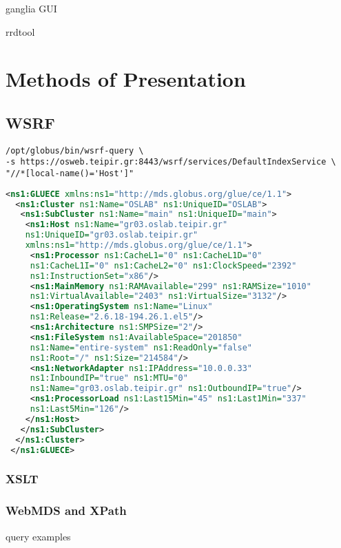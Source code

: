 ganglia GUI

rrdtool

\section{Methods of Presentation}


\subsection{WSRF}
\begin{verbatim}
/opt/globus/bin/wsrf-query \
-s https://osweb.teipir.gr:8443/wsrf/services/DefaultIndexService \
"//*[local-name()='Host']"
\end{verbatim}


\begin{lstlisting}[language=XML,caption=WSRF query output]
 <ns1:GLUECE xmlns:ns1="http://mds.globus.org/glue/ce/1.1">
  <ns1:Cluster ns1:Name="OSLAB" ns1:UniqueID="OSLAB">
   <ns1:SubCluster ns1:Name="main" ns1:UniqueID="main">
    <ns1:Host ns1:Name="gr03.oslab.teipir.gr" 
    ns1:UniqueID="gr03.oslab.teipir.gr" 
    xmlns:ns1="http://mds.globus.org/glue/ce/1.1">
     <ns1:Processor ns1:CacheL1="0" ns1:CacheL1D="0" 
     ns1:CacheL1I="0" ns1:CacheL2="0" ns1:ClockSpeed="2392" 
     ns1:InstructionSet="x86"/>
     <ns1:MainMemory ns1:RAMAvailable="299" ns1:RAMSize="1010" 
     ns1:VirtualAvailable="2403" ns1:VirtualSize="3132"/>
     <ns1:OperatingSystem ns1:Name="Linux"
     ns1:Release="2.6.18-194.26.1.el5"/>
     <ns1:Architecture ns1:SMPSize="2"/>
     <ns1:FileSystem ns1:AvailableSpace="201850" 
     ns1:Name="entire-system" ns1:ReadOnly="false"
     ns1:Root="/" ns1:Size="214584"/>
     <ns1:NetworkAdapter ns1:IPAddress="10.0.0.33" 
     ns1:InboundIP="true" ns1:MTU="0" 
     ns1:Name="gr03.oslab.teipir.gr" ns1:OutboundIP="true"/>
     <ns1:ProcessorLoad ns1:Last15Min="45" ns1:Last1Min="337"
     ns1:Last5Min="126"/>
    </ns1:Host>
   </ns1:SubCluster>
  </ns1:Cluster>
 </ns1:GLUECE>
\end{lstlisting}

\subsubsection{XSLT}

\subsubsection{WebMDS and XPath}
query examples


